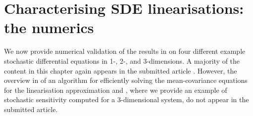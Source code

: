 
\chapter{Characterising SDE linearisations: the numerics}\label{ch:linear_numerics}
We now provide numerical validation of the results in  on four different example stochastic differential equations in 1-, 2-, and 3-dimensions.
A majority of the content in this chapter again appears in the submitted article \citep{BlakeEtAl_2023_ConvergenceStochasticDifferential}.
However, the overview in  of an algorithm \citep{Mazzoni_2008_ComputationalAspectsContinuous} for efficiently solving the mean-covariance equations for the linearisation approximation and , where we provide an example of stochastic sensitivity computed for a 3-dimensional system, do not appear in the submitted article.

